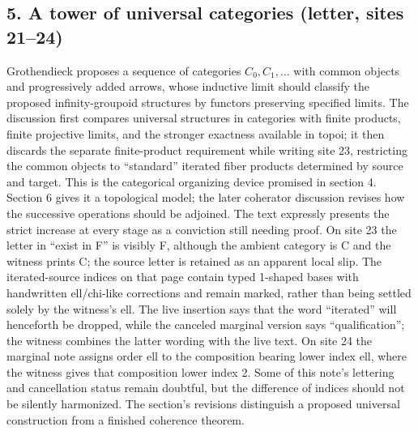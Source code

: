 \documentclass[10pt,oneside]{book}
\begin{document}
\subsection*{5. A tower of universal categories (letter, sites 21--24)}
Grothendieck proposes a sequence of categories $C_0,C_1,\ldots$ with common objects and progressively added arrows, whose inductive limit should classify the proposed infinity-groupoid structures by functors preserving specified limits. The discussion first compares universal structures in categories with finite products, finite projective limits, and the stronger exactness available in topoi; it then discards the separate finite-product requirement while writing site 23, restricting the common objects to ``standard'' iterated fiber products determined by source and target. This is the categorical organizing device promised in section 4. Section 6 gives it a topological model; the later coherator discussion revises how the successive operations should be adjoined. The text expressly presents the strict increase at every stage as a conviction still needing proof. On site 23 the letter in ``exist in F'' is visibly F, although the ambient category is C and the witness prints C; the source letter is retained as an apparent local slip. The iterated-source indices on that page contain typed 1-shaped bases with handwritten ell/chi-like corrections and remain marked, rather than being settled solely by the witness's ell. The live insertion says that the word ``iterated'' will henceforth be dropped, while the canceled marginal version says ``qualification''; the witness combines the latter wording with the live text. On site 24 the marginal note assigns order ell to the composition bearing lower index ell, where the witness gives that composition lower index 2. Some of this note's lettering and cancellation status remain doubtful, but the difference of indices should not be silently harmonized. The section's revisions distinguish a proposed universal construction from a finished coherence theorem.
\end{document}

